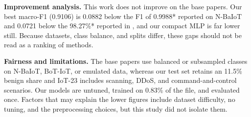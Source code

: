 \textbf{Improvement analysis.} This work does not improve on the base papers. Our best macro-F1 (0.9106) is 0.0882 below the F1 of 0.9988* reported on N-BaIoT \cite{babenko2026} and 0.0721 below the 98.27\%* reported in \cite{aljaafreh2026}, and our compact MLP is far lower still. Because datasets, class balance, and splits differ, these gaps should not be read as a ranking of methods.

\textbf{Fairness and limitations.} The base papers use balanced or subsampled classes on N-BaIoT, BoT-IoT, or emulated data, whereas our test set retains an 11.5\% benign share and IoT-23 includes scanning, DDoS, and command-and-control scenarios. Our models are untuned, trained on 0.83\% of the file, and evaluated once. Factors that may explain the lower figures include dataset difficulty, no tuning, and the preprocessing choices, but this study did not isolate them.